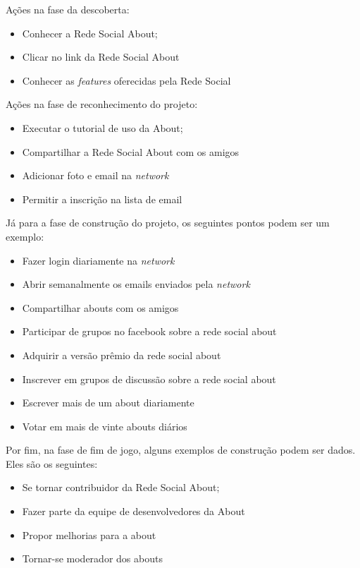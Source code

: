 Ações na fase da descoberta:
\begin{itemize}
    \item Conhecer a Rede Social About;
    \item Clicar no link da Rede Social About
    \item Conhecer as \textit{features} oferecidas pela Rede Social
\end{itemize}


Ações na fase de reconhecimento do projeto:
\begin{itemize}
    \item Executar o tutorial de uso da About;
    \item Compartilhar a Rede Social About com os amigos
    \item Adicionar foto e email na \textit{network}
    \item Permitir a inscrição na lista de email
\end{itemize}

Já para a fase de construção do projeto, os seguintes pontos podem ser um
exemplo:

\begin{itemize}
    \item Fazer login diariamente na \textit{network}
    \item Abrir semanalmente os emails enviados pela \textit{network}
    \item Compartilhar abouts com os amigos
    \item Participar de grupos no facebook sobre a rede social about
    \item Adquirir a versão prêmio da rede social about
    \item Inscrever em grupos de discussão sobre a rede social about
    \item Escrever mais de um about diariamente
    \item Votar em mais de vinte abouts diários
\end{itemize}

Por fim, na fase de fim de jogo, alguns exemplos de construção podem ser dados.
Eles são os seguintes:
\begin{itemize}
    \item Se tornar contribuidor da Rede Social About;
    \item Fazer parte da equipe de desenvolvedores da About
    \item Propor melhorias para a about
    \item Tornar-se moderador dos abouts
\end{itemize}

